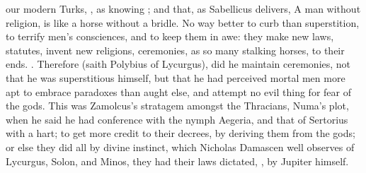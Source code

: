{our modern Turks, , as knowing ; and that, as Sabellicus delivers, A man without
religion, is like a horse without a bridle. No way better to curb than
superstition, to terrify men's consciences, and to keep them in awe:
they make new laws, statutes, invent new religions, ceremonies, as so
many stalking horses, to their ends. . Therefore (saith
Polybius of Lycurgus), did he maintain ceremonies, not that he
was superstitious himself, but that he had perceived mortal men more
apt to embrace paradoxes than aught else, and  attempt no evil
thing for fear of the gods. This was Zamolcus's stratagem amongst the
Thracians, Numa's plot, when he said he had conference with the nymph
Aegeria, and that of Sertorius with a hart; to get more credit to their
decrees, by deriving them from the gods; or else they did all by divine
instinct, which Nicholas Damascen well observes of Lycurgus, Solon, and
Minos, they had their laws dictated, , by Jupiter himself.

}
